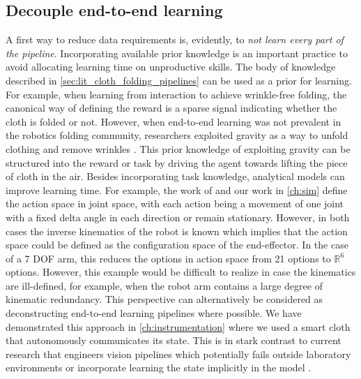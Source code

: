 \documentclass[\home/main.tex]{subfiles}
\begin{document}
\subsection{Decouple end-to-end learning}
A first way to reduce data requirements is, evidently, to \emph{not learn every part of the pipeline}. Incorporating available prior knowledge is an important practice to avoid allocating learning time on unproductive skills.
The body of knowledge described in \cref{sec:lit_cloth_folding_pipelines} can be used as a prior for learning. For example, when learning from interaction to achieve wrinkle-free folding, the canonical way of defining the reward is a sparse signal indicating whether the cloth is folded or not. However, when end-to-end learning was not prevalent in the robotics folding community, researchers exploited gravity as a way to unfold clothing and remove wrinkles \autocite{Doumanoglou2016,Maitin2010}. This prior knowledge of exploiting gravity can be structured into the reward or task by driving the agent towards lifting the piece of cloth in the air.
Besides incorporating task knowledge, analytical models can improve learning time. For example, the work of \textcite{Zhang2015} and our work in \cref{ch:sim} define the action space in joint space, with each action being a movement of one joint with a fixed delta angle in each direction or remain stationary. However, in both cases the inverse kinematics of the robot is known which implies that the action space could be defined as the configuration space of the end-effector. In the case of a 7 \gls{DOF} arm, this reduces the options in action space from 21  options to $\mathbb{R}^6$ options. However, this example would be difficult to realize in case the kinematics are ill-defined, for example, when the robot arm contains a large degree of kinematic redundancy. 
This perspective can alternatively be considered as deconstructing end-to-end learning pipelines where possible. We have demonstrated this approach in \cref{ch:instrumentation} where we used a smart cloth that autonomously communicates its state. This is in stark contrast to current research that engineers vision pipelines \autocite{Wu2020} which potentially fails outside laboratory environments or incorporate learning the state implicitly in the model \autocite{Matas2018}. 
\end{document}

